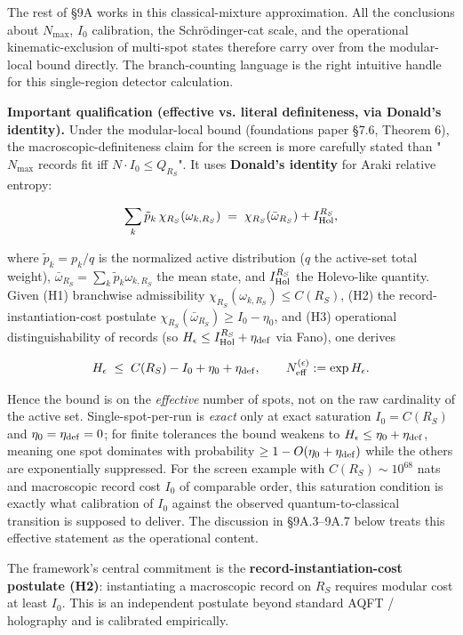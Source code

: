 \documentclass[11pt,a4paper]{article}
\begin{document}
The rest of §9A works in this classical-mixture approximation. All the conclusions about $N_{\max}$, $I_0$ calibration, the Schrödinger-cat scale, and the operational kinematic-exclusion of multi-spot states therefore carry over from the modular-local bound directly. The branch-counting language is the right intuitive handle for this single-region detector calculation.

\textbf{Important qualification (effective vs. literal definiteness, via Donald's identity).} Under the modular-local bound (foundations paper §7.6, Theorem 6), the macroscopic-definiteness claim for the screen is more carefully stated than "$N_{\max}$ records fit iff $N \cdot I_0 \le Q_{R_S}$". It uses \textbf{Donald's identity} for Araki relative entropy:

\[
\sum_{k} \tilde p_k \, \chi_{R_S}(\omega_{k, R_S}) \;=\; \chi_{R_S}(\bar\omega_{R_S}) + I_{\rm Hol}^{R_S},
\]

where $\tilde p_k = p_k / q$ is the normalized active distribution ($q$ the active-set total weight), $\bar\omega_{R_S} = \sum_k \tilde p_k \omega_{k, R_S}$ the mean state, and $I_{\rm Hol}^{R_S}$ the Holevo-like quantity. Given (H1) branchwise admissibility $\chi_{R_S}(\omega_{k,R_S}) \le C(R_S)$, (H2) the record-instantiation-cost postulate $\chi_{R_S}(\bar\omega_{R_S}) \ge I_0 - \eta_0$, and (H3) operational distinguishability of records (so $H_\epsilon \le I_{\rm Hol}^{R_S} + \eta_{\rm def}$ via Fano), one derives

\[
H_\epsilon \;\le\; C(R_S) - I_0 + \eta_0 + \eta_{\rm def}, \qquad N^{(\epsilon)}_{\rm eff} := \exp H_\epsilon.
\]

Hence the bound is on the \emph{effective} number of spots, not on the raw cardinality of the active set. Single-spot-per-run is \emph{exact} only at exact saturation $I_0 = C(R_S)$ and $\eta_0 = \eta_{\rm def} = 0$; for finite tolerances the bound weakens to $H_\epsilon \le \eta_0 + \eta_{\rm def}$, meaning one spot dominates with probability $\ge 1 - O(\eta_0 + \eta_{\rm def})$ while the others are exponentially suppressed. For the screen example with $C(R_S) \sim 10^{68}$ nats and macroscopic record cost $I_0$ of comparable order, this saturation condition is exactly what calibration of $I_0$ against the observed quantum-to-classical transition is supposed to deliver. The discussion in §9A.3–9A.7 below treats this effective statement as the operational content.

The framework's central commitment is the \textbf{record-instantiation-cost postulate (H2)}: instantiating a macroscopic record on $R_S$ requires modular cost at least $I_0$. This is an independent postulate beyond standard AQFT / holography and is calibrated empirically.
\end{document}
